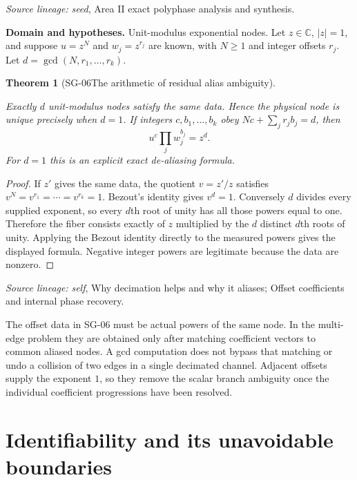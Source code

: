\documentclass[11pt]{article}
\newtheorem{theorem}{Theorem}[section]
\theoremstyle{definition}\newtheorem{definition}[theorem]{Definition}
\theoremstyle{remark}\newtheorem{remark}[theorem]{Remark}
\begin{document}
\par{\small\color{Teal}\textit{Source lineage:} \textit{seed}, Area II exact polyphase analysis and synthesis.}\par

\par{\small\textbf{Domain and hypotheses.} Unit-modulus exponential nodes. Let $z\in\mathbb C$, $|z|=1$, and suppose $u=z^N$ and $w_j=z^{r_j}$ are known, with $N\ge1$ and integer offsets $r_j$. Let $d=\gcd(N,r_1,\ldots,r_k)$.}\par
\begin{theorem}[SG-06\quad The arithmetic of residual alias ambiguity]\label{SG-06}

Exactly $d$ unit-modulus nodes satisfy the same data. Hence the physical node
is unique precisely when $d=1$. If integers $c,b_1,\ldots,b_k$ obey
$Nc+\sum_jr_jb_j=d$, then
\[
 u^c\prod_jw_j^{b_j}=z^d.
\]
For $d=1$ this is an explicit exact de-aliasing formula.

\end{theorem}
\begin{proof}

If $z'$ gives the same data, the quotient $v=z'/z$ satisfies
$v^N=v^{r_1}=\cdots=v^{r_k}=1$. Bezout's identity gives $v^d=1$.
Conversely $d$ divides every supplied exponent, so every $d$th root of unity
has all those powers equal to one. Therefore the fiber consists exactly of
$z$ multiplied by the $d$ distinct $d$th roots of unity. Applying the Bezout
identity directly to the measured powers gives the displayed formula.
Negative integer powers are legitimate because the data are nonzero.

\end{proof}

\par{\small\color{Teal}\textit{Source lineage:} \textit{self}, Why decimation helps and why it aliases; Offset coefficients and internal phase recovery.}\par


The offset data in SG-06 must be actual powers of the same node. In the
multi-edge problem they are obtained only after matching coefficient vectors
to common aliased nodes. A gcd computation does not bypass that matching or
undo a collision of two edges in a single decimated channel. Adjacent offsets
supply the exponent $1$, so they remove the scalar branch ambiguity once the
individual coefficient progressions have been resolved.


\section{Identifiability and its unavoidable boundaries}
\end{document}
